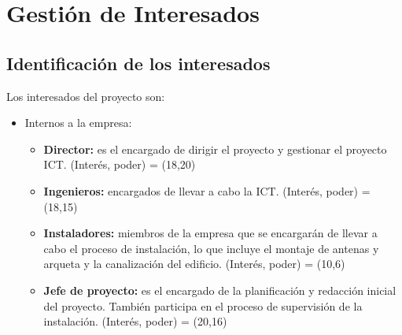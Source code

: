 \chapter{Gestión de Interesados}
\section{Identificación de los interesados}
Los interesados del proyecto son:
\begin{itemize}
    \item Internos a la empresa:
\begin{itemize}
    \item \textbf{Director: } es el encargado de dirigir el proyecto y gestionar el proyecto ICT. (Interés, poder) = (18,20)
    \item \textbf{Ingenieros: } encargados de llevar a cabo la ICT. (Interés, poder) = (18,15)
    \item \textbf{Instaladores: }miembros de la empresa que se encargarán de llevar a cabo el proceso de instalación, lo que incluye el montaje de antenas y arqueta y la canalización del edificio. (Interés, poder) = (10,6)
    \item \textbf{Jefe de proyecto: } es el encargado de la planificación y redacción inicial del proyecto. También participa en el proceso de supervisión de la instalación. (Interés, poder) = (20,16)
    \end{itemize}
\end{itemize}  
